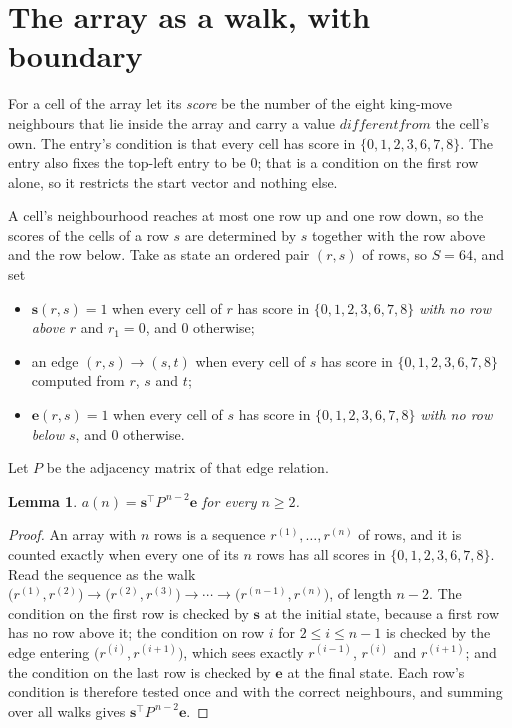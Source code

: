 \documentclass[11pt,a4paper]{article}
\theoremstyle{plain}
\newtheorem{lemma}[theorem]{Lemma}
\theoremstyle{definition}
\begin{document}
\section{The array as a walk, with boundary}

For a cell of the array let its \emph{score} be the number of the eight king-move neighbours that lie inside
the array and carry a value $different from$ the cell's own. The entry's condition is that every cell
has score in $\{0,1,2,3,6,7,8\}$. The entry also fixes the top-left entry to be $0$; that is a condition on the first row alone, so it restricts the start vector and nothing else.

A cell's neighbourhood reaches at most one row up and one row down, so the scores of the
cells of a row $s$ are determined by $s$ together with the row above and the row below.
Take as state an ordered pair $(r,s)$ of rows, so $S=64$, and set
\begin{itemize}
\item $\mathbf{s}(r,s)=1$ when every cell of $r$ has score in $\{0,1,2,3,6,7,8\}$ \emph{with no row
above $r$} and $r_1=0$, and $0$ otherwise;
\item an edge $(r,s)\to(s,t)$ when every cell of $s$ has score in $\{0,1,2,3,6,7,8\}$ computed from
$r$, $s$ and $t$;
\item $\mathbf{e}(r,s)=1$ when every cell of $s$ has score in $\{0,1,2,3,6,7,8\}$ \emph{with no row
below $s$}, and $0$ otherwise.
\end{itemize}
Let $P$ be the adjacency matrix of that edge relation.

\begin{lemma}\label{lem:walk}
$a(n)=\mathbf{s}^{\!\top}P^{\,n-2}\mathbf{e}$ for every $n\ge2$.
\end{lemma}

\begin{proof}
An array with $n$ rows is a sequence $r^{(1)},\dots,r^{(n)}$ of rows, and it is counted
exactly when every one of its $n$ rows has all scores in $\{0,1,2,3,6,7,8\}$. Read the sequence as the
walk $\bigl(r^{(1)},r^{(2)}\bigr)\to\bigl(r^{(2)},r^{(3)}\bigr)\to\cdots\to
\bigl(r^{(n-1)},r^{(n)}\bigr)$, of length $n-2$. The condition on the first row is
checked by $\mathbf{s}$ at the initial state, because a first row has no row above it; the
condition on row $i$ for $2\le i\le n-1$ is checked by the edge entering
$\bigl(r^{(i)},r^{(i+1)}\bigr)$, which sees exactly $r^{(i-1)}$, $r^{(i)}$ and
$r^{(i+1)}$; and the condition on the last row is checked by $\mathbf{e}$ at the final
state. Each row's condition is therefore tested once and with the correct neighbours, and
summing over all walks gives $\mathbf{s}^{\!\top}P^{\,n-2}\mathbf{e}$.
\end{proof}
\end{document}
